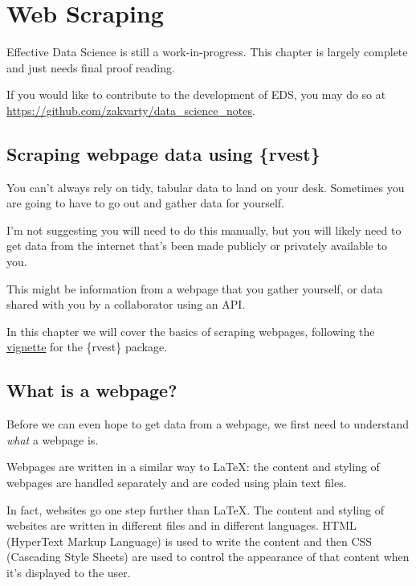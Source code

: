 \documentclass[
  12pt,
]{book}
\begin{document}
\hypertarget{data-webscraping}{%
\chapter{Web Scraping}\label{data-webscraping}}

Effective Data Science is still a work-in-progress. This chapter is largely complete and just needs final proof reading.

If you would like to contribute to the development of EDS, you may do so at \url{https://github.com/zakvarty/data_science_notes}.

\hypertarget{scraping-webpage-data-using-rvest}{%
\section{Scraping webpage data using \{rvest\}}\label{scraping-webpage-data-using-rvest}}

You can't always rely on tidy, tabular data to land on your desk. Sometimes you are going to have to go out and gather data for yourself.

I'm not suggesting you will need to do this manually, but you will likely need to get data from the internet that's been made publicly or privately available to you.

This might be information from a webpage that you gather yourself, or data shared with you by a collaborator using an API.

In this chapter we will cover the basics of scraping webpages, following the \href{https://cran.r-project.org/web/packages/rvest/vignettes/rvest.html\#fnref3}{vignette} for the \{rvest\} package.

\hypertarget{what-is-a-webpage}{%
\section{What is a webpage?}\label{what-is-a-webpage}}

Before we can even hope to get data from a webpage, we first need to understand \emph{what} a webpage is.

Webpages are written in a similar way to LaTeX: the content and styling of webpages are handled separately and are coded using plain text files.

In fact, websites go one step further than LaTeX. The content and styling of websites are written in different files and in different languages. HTML (HyperText Markup Language) is used to write the content and then CSS (Cascading Style Sheets) are used to control the appearance of that content when it's displayed to the user.
\end{document}
